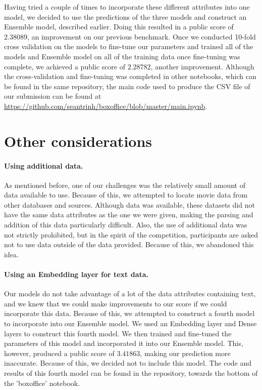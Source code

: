 \documentclass[11pt]{article}
\numberwithin{equation}{section}
\begin{document}
Having tried a couple of times to incorporate these different attributes into one model, we decided to use the predictions of the three models and construct an Ensemble model, described earlier. Doing this resulted in a public score of $2.38089$, an improvement on our previous benchmark. Once we conducted 10-fold cross validation on the models to fine-tune our parameters and trained all of the models and Ensemble model on all of the training data once fine-tuning was complete, we achieved a public score of $2.28782$, another improvement. Although the cross-validation and fine-tuning was completed in other notebooks, which can be found in the same repository, the main code used to produce the CSV file of our submission can be found at \url{https://github.com/seantrinh/boxoffice/blob/master/main.ipynb}.

\section{Other considerations}

\paragraph{Using additional data.}
As mentioned before, one of our challenges was the relatively small amount of data available to use. Because of this, we attempted to locate movie data from other databases and sources. Although data was available, these datasets did not have the same data attributes as the one we were given, making the parsing and addition of this data particularly difficult. Also, the use of additional data was not strictly prohibited, but in the spirit of the competition, participants are asked not to use data outside of the data provided. Because of this, we abandoned this idea.

\paragraph{Using an Embedding layer for text data.}
Our models do not take advantage of a lot of the data attributes containing text, and we knew that we could make improvements to our score if we could incorporate this data. Because of this, we attempted to construct a fourth model to incorporate into our Ensemble model. We used an Embedding layer and Dense layers to construct this fourth model. We then trained and fine-tuned the parameters of this model and incorporated it into our Ensemble model. This, however, produced a public score of $3.41863$, making our prediction more inaccurate. Because of this, we decided not to include this model. The code and results of this fourth model can be found in the repository, towards the bottom of the 'boxoffice' notebook.
\end{document}
